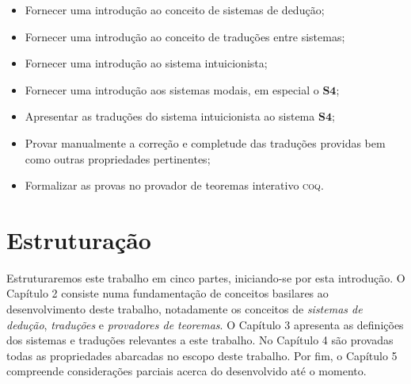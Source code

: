     \begin{itemize}
        \item Fornecer uma introdução ao conceito de sistemas de dedução;
        \item Fornecer uma introdução ao conceito de traduções entre sistemas;
        \item Fornecer uma introdução ao sistema intuicionista;
        \item Fornecer uma introdução aos sistemas modais, em especial o $\mathbf{S4}$;
        \item Apresentar as traduções do sistema intuicionista ao sistema $\mathbf{S4}$;
        \item Provar manualmente a correção e completude das traduções providas bem como outras propriedades pertinentes;
        \item Formalizar as provas no provador de teoremas interativo \textsc{coq}.
    \end{itemize}

    \section{Estruturação}
    Estruturaremos este trabalho em cinco partes, iniciando-se por esta introdução. O Capítulo 2 consiste numa fundamentação de conceitos basilares ao desenvolvimento deste trabalho, notadamente os conceitos de \emph{sistemas de dedução}, \emph{traduções} e \emph{provadores de teoremas}. O Capítulo 3 apresenta as definições dos sistemas e traduções relevantes a este trabalho. No Capítulo 4 são provadas todas as propriedades abarcadas no escopo deste trabalho. Por fim, o Capítulo 5 compreende considerações parciais acerca do desenvolvido até o momento.